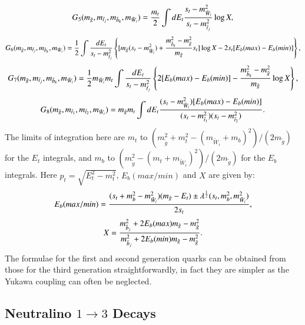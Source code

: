 \documentclass[final,3p,times]{elsarticle}
\begin{document}
\begin{equation}
G_{5}(m_{\tilde{g}},m_{\tilde{t}_j},m_{\tilde{b}_k},m_{\tilde{W}_i}) = {m_{t} \over 2} \int {d E_{t}} {s_t -m_{\tilde{W}_i}^2 \over s_t - m_{\tilde{t}_j}^2} \log X,
\end{equation}
\begin{equation}
G_{6}(m_{\tilde{g}},m_{\tilde{t}_j},m_{\tilde{b}_k},m_{\tilde{W}_i}) = {1 \over 2} \int {d E_t \over s_t - m_{\tilde{t}_j}^2} \left\lbrace [ m_{\tilde{g}} (s_{t} - m_{\tilde{W}_i}^2) + {m_{\tilde{b}_k}^2 - m_{\tilde{g}}^2 \over m_{\tilde{g}}} s_{t}] \log X - 2 s_{t} [E_{b}(max) - E_{b}(min)] \right\rbrace,
\end{equation}
\begin{equation}
G_{7}(m_{\tilde{g}},m_{\tilde{t}_j},m_{\tilde{b}_k},m_{\tilde{W}_i}) = {1 \over 2} m_{\tilde{W}_i} m_{t} \int {d E_t \over s_t - m_{\tilde{t}_j}^2} \left\lbrace 2[E_{b}(max) - E_{b}(min)] - {m_{\tilde{b}_k}^2 - m_{\tilde{g}}^2 \over m_{\tilde{g}}} \log X \right\rbrace,
\end{equation}
\begin{equation}
G_{8}(m_{\tilde{g}},m_{\tilde{t}_1},m_{\tilde{t}_2},m_{\tilde{W}_i}) = m_{\tilde{g}} m_{t} \int {d E_t} {(s_{t} - m_{\tilde{W}_i}^2) [E_{b}(max) - E_{b}(min)] \over (s_{t} - m_{\tilde{t}_1}^2)(s_{t} - m_{\tilde{t}_2}^2)}.
\end{equation}
The limits of integration here are $m_t$ to $(m_{\tilde{g}}^2 + m_{t}^2 - (m_{\tilde{W}_i}+m_{b})^2)/(2m_{\tilde{g}})$ for the $E_t$ integrals, and $m_{b}$ to $(m_{\tilde{g}}^2 - (m_t + m_{\tilde{W}_i})^2)/(2 m_{\tilde{g}})$ for the $E_b$ integrals.
Here $p_t = \sqrt{E_{t}^2 - m_{t}^2}$, $E_{b}(max/min)$ and $X$ are given by:
\begin{equation}
E_{b}(max/min) = {(s_{t} + m_{b}^2 - m_{\tilde{W}_i}^2)(m_{\tilde{g}} - E_{t}) \pm \lambda^{1 \over 2}(s_{t},m_{b}^2,m_{\tilde{W}_i}^2) \over 2 s_{t}},
\end{equation}
\begin{equation}
X = {m_{\tilde{b}_j}^2 + 2 E_{b}(max) m_{\tilde{g}} - m_{\tilde{g}}^2 \over m_{\tilde{b}_j}^2 + 2 E_{b}(min) m_{\tilde{g}} - m_{\tilde{g}}^2}.
\end{equation}
The formulae for the first and second generation quarks can be obtained from those for the third generation straightforwardly, in fact they are simpler as the Yukawa coupling can often be neglected.
\subsection{Neutralino $1 \rightarrow 3$ Decays}
\end{document}
